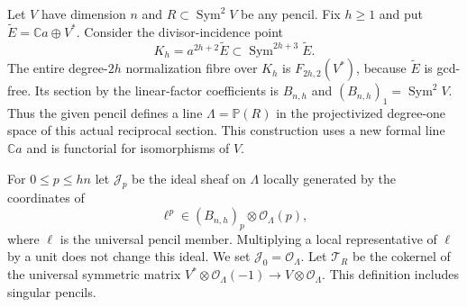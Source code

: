\documentclass[11pt,reqno]{amsart}
\numberwithin{equation}{section}
\theoremstyle{definition}\newtheorem{definition}[theorem]{Definition}
\theoremstyle{remark}\newtheorem{remark}[theorem]{Remark}
\newcommand{\C}{\mathbb C}\newcommand{\Q}{\mathbb Q}
\newcommand{\Pj}{\mathbb P}\newcommand{\A}{\mathbb A}
\newcommand{\OO}{\mathcal O}\newcommand{\II}{\mathcal I}
\DeclareMathOperator{\Sym}{Sym}\DeclareMathOperator{\Gr}{Gr}
\begin{document}
Let $V$ have dimension $n$ and $R\subset\Sym^2V$ be any pencil.
Fix $h\geq1$ and put $\widetilde E=\C a\oplus V^*$.
Consider the divisor-incidence point
\begin{equation}\label{eq:canonical-reciprocal-point-v155}
 K_h=a^{2h+2}\widetilde E
         \subset\Sym^{2h+3}\widetilde E.
\end{equation}
The entire degree-$2h$ normalization fibre over $K_h$ is
$F_{2h,2}(V^*)$, because $\widetilde E$ is gcd-free.  Its section
by the linear-factor coefficients is $B_{n,h}$ and
$(B_{n,h})_1=\Sym^2V$.  Thus the given pencil defines a line
$\Lambda=\Pj(R)$ in the projectivized degree-one space of this
actual reciprocal section.  This construction uses a new formal
line $\C a$ and is functorial for isomorphisms of $V$.

For $0\leq p\leq hn$ let $\mathcal J_p$ be the ideal sheaf on
$\Lambda$ locally generated by the coordinates of
\begin{equation}\label{eq:power-map-v155}
       \ell^p\in(B_{n,h})_p\otimes\OO_\Lambda(p),
\end{equation}
where $\ell$ is the universal pencil member.  Multiplying a local
representative of $\ell$ by a unit does not change this ideal.
We set $\mathcal J_0=\OO_\Lambda$.
Let $\mathcal T_R$ be the cokernel of the universal symmetric
matrix $V^*\otimes\OO_\Lambda(-1)\to V\otimes\OO_\Lambda$.
This definition includes singular pencils.
\end{document}
